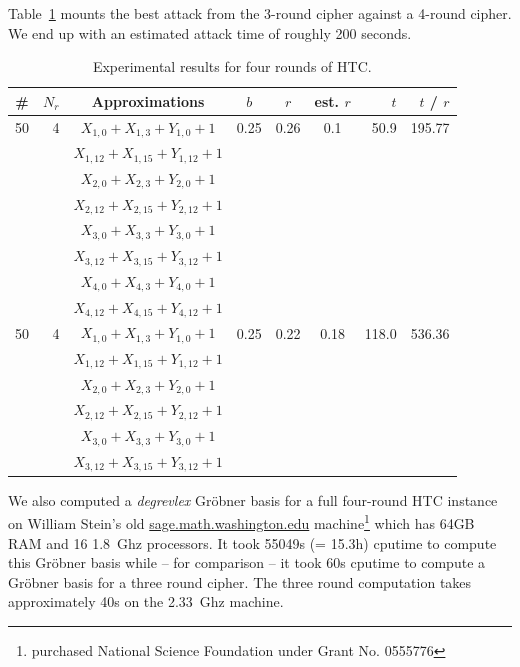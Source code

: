 Table~\ref{tab:exp-4-rounds} mounts the best attack from the 3-round cipher against a 4-round cipher. We end up with
an estimated attack time of roughly 200 seconds.

\begin{table}[ht]
\begin{small}
\begin{center}
\begin{tabular}{|c|r|c|c|c|c|r|r|}
\hline
\#	& $N_r$ & Approximations & $b$ & $r$ & est. $r$ & $t$ & $t$ / $r$\\
\hline
50 & 4 & $X_{1, 0} + X_{1, 3} + Y_{1, 0} + 1$ & 0.25 & 0.26 & 0.1 & 50.9 & 195.77\\
   &   & $X_{1,12} + X_{1,15} + Y_{1,12} + 1$ & & & & & \\
   &   & $X_{2, 0} + X_{2, 3} + Y_{2, 0} + 1$ & & & & & \\
   &   & $X_{2,12} + X_{2,15} + Y_{2,12} + 1$ & & & & & \\
   &   & $X_{3, 0} + X_{3, 3} + Y_{3, 0} + 1$ & & & & & \\
   &   & $X_{3,12} + X_{3,15} + Y_{3,12} + 1$ & & & & & \\
   &   & $X_{4, 0} + X_{4, 3} + Y_{4, 0} + 1$ & & & & & \\
   &   & $X_{4,12} + X_{4,15} + Y_{4,12} + 1$ & & & & & \\
\hline
50 & 4 & $X_{1, 0} + X_{1, 3} + Y_{1, 0} + 1$ & 0.25 & 0.22 & 0.18 &118.0	& 536.36\\
   &   & $X_{1,12} + X_{1,15} + Y_{1,12} + 1$ & & & & & \\
   &   & $X_{2, 0} + X_{2, 3} + Y_{2, 0} + 1$ & & & & & \\
   &   & $X_{2,12} + X_{2,15} + Y_{2,12} + 1$ & & & & & \\
   &   & $X_{3, 0} + X_{3, 3} + Y_{3, 0} + 1$ & & & & & \\
   &   & $X_{3,12} + X_{3,15} + Y_{3,12} + 1$ & & & & & \\
\hline
\end{tabular}
\end{center}
\end{small}
\caption{Experimental results for four rounds of HTC.}
\label{tab:exp-4-rounds}
\end{table}

We also computed a \emph{degrevlex} Gröbner basis for a full four-round HTC instance on William Stein's old \url{sage.math.washington.edu} machine\footnote{purchased National Science Foundation under Grant No. 0555776} which has 64GB RAM and 16 1.8~Ghz \Opteron processors. It took 55049s (= 15.3h) cputime to compute this Gröbner basis while -- for comparison -- it took 60s cputime to compute a Gröbner basis for a three round cipher. The three round computation takes approximately 40s on the 2.33~Ghz \CTD machine.

